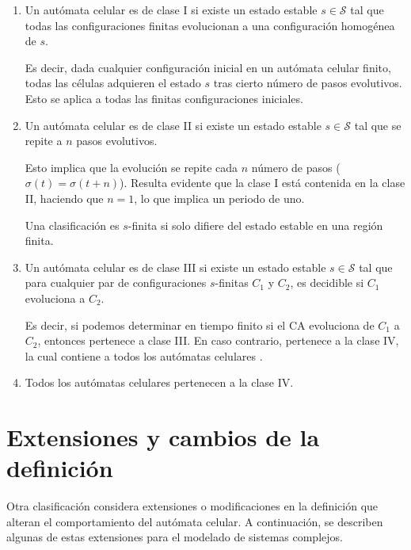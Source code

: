 \begin{enumerate}[label*=CY \Roman*]
	\item Un autómata celular es de clase I si existe un estado estable $s \in \mathcal{S}$ tal que todas las configuraciones finitas evolucionan a una configuración homogénea de $s$.
	
	Es decir, dada cualquier configuración inicial en un autómata celular finito, todas las células adquieren el estado $s$ tras cierto número de pasos evolutivos. Esto se aplica a todas las finitas configuraciones iniciales.
	
	\item Un autómata celular es de clase II si existe un estado estable $s \in \mathcal{S}$ tal que se repite a $n$ pasos evolutivos.
	
	Esto implica que la evolución se repite cada $n$ número de pasos ($\sigma(t) = \sigma(t + n)$). Resulta evidente que la clase I está contenida en la clase II, haciendo que $n = 1$, lo que implica un periodo de uno.
	
	Una clasificación es $s$-finita si solo difiere del estado estable en una región finita.
	
	\item Un autómata celular es de clase III si existe un estado estable $s \in \mathcal{S}$ tal que para cualquier par de configuraciones $s$-finitas $C_1$ y $C_2$, es decidible si $C_1$ evoluciona a $C_2$.
	
	Es decir, si podemos determinar en tiempo finito si el CA evoluciona de $C_1$ a $C_2$, entonces pertenece a clase III. En caso contrario, pertenece a la clase IV, la cual contiene a todos los autómatas celulares \cite{CAclassification}.
	
	\item Todos los autómatas celulares pertenecen a la clase IV.	
\end{enumerate}

\section{Extensiones y cambios de la definición}

Otra clasificación considera extensiones o modificaciones en la definición que alteran el comportamiento del autómata celular. A continuación, se describen algunas de estas extensiones para el modelado de sistemas complejos. 

